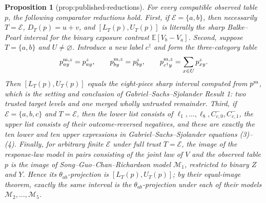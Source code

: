 \documentclass{article}
\newtheorem{proposition}{Proposition}
\begin{document}
\begin{proposition}[prop:published-reductions]\label{prop:published-reductions}
For every compatible observed table \(p\), the following comparator reductions hold.  First, if \(\mathcal E=\{a,b\}\), then necessarily \(T=\mathcal E\), \(D_T(p)=u+v\), and \([L_T(p),U_T(p)]\) is literally the sharp Balke--Pearl interval for the binary exposure contrast \(\mathbb E[V_b-V_a]\).  Second, suppose \(T=\{a,b\}\) and \(U\neq\varnothing\).  Introduce a new label \(c^\dagger\) and form the three-category table
\[
 p^{{\rm m},z}_{ay}=p^z_{ay},\qquad
 p^{{\rm m},z}_{by}=p^z_{by},\qquad
 p^{{\rm m},z}_{c^\dagger y}=\sum_{x\in U}p^z_{xy}.
\]
Then \([L_T(p),U_T(p)]\) equals the eight-piece sharp interval computed from \(p^{\rm m}\), which is the setting and conclusion of Gabriel--Sachs--Sjolander Result 1: two trusted target levels and one merged wholly untrusted remainder.  Third, if \(\mathcal E=\{a,b,c\}\) and \(T=\mathcal E\), then the lower list consists of \(\ell_1,\ldots,\ell_8,C^-_{c,0},C^-_{c,1}\), the upper list consists of their outcome-reversed negatives, and these are exactly the ten lower and ten upper expressions in Gabriel--Sachs--Sjolander equations (3)--(4).  Finally, for arbitrary finite \(\mathcal E\) under full trust \(T=\mathcal E\), the image of the response-law model in pairs consisting of the joint law of \(V\) and the observed table \(p\) is the image of Song--Guo--Chan--Richardson model \(\mathcal M_1\), restricted to binary \(Z\) and \(Y\).  Hence its \(\theta_{ab}\)-projection is \([L_T(p),U_T(p)]\); by their equal-image theorem, exactly the same interval is the \(\theta_{ab}\)-projection under each of their models \(\mathcal M_2,\ldots,\mathcal M_5\).
\end{proposition}
\end{document}
